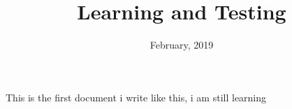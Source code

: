 \documentclass[12pt, letterpaper, twoside]{article}
\title{Learning and Testing}
\author{Juan P. Romano \thanks Powered by Overleaf}
\date{February, 2019}
\begin{document}
\maketitle

This is the first document i write like this, i am still learning

\end{document}
